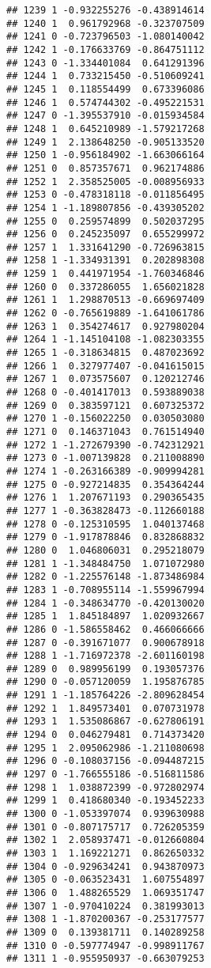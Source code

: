 \documentclass[
]{article}
\begin{document}
\begin{verbatim}
## 1239 1 -0.932255276 -0.438914614
## 1240 1  0.961792968 -0.323707509
## 1241 0 -0.723796503 -1.080140042
## 1242 1 -0.176633769 -0.864751112
## 1243 0 -1.334401084  0.641291396
## 1244 1  0.733215450 -0.510609241
## 1245 1  0.118554499  0.673396086
## 1246 1  0.574744302 -0.495221531
## 1247 0 -1.395537910 -0.015934584
## 1248 1  0.645210989 -1.579217268
## 1249 1  2.138648250 -0.905133520
## 1250 1 -0.956184902 -1.663066164
## 1251 0  0.857357671  0.962174886
## 1252 1  2.358525005 -0.008956933
## 1253 0 -0.478318118 -0.011856495
## 1254 1 -1.189807856 -0.439305202
## 1255 0  0.259574899  0.502037295
## 1256 0  0.245235097  0.655299972
## 1257 1  1.331641290 -0.726963815
## 1258 1 -1.334931391  0.202898308
## 1259 1  0.441971954 -1.760346846
## 1260 0  0.337286055  1.656021828
## 1261 1  1.298870513 -0.669697409
## 1262 0 -0.765619889 -1.641061786
## 1263 1  0.354274617  0.927980204
## 1264 1 -1.145104108 -1.082303355
## 1265 1 -0.318634815  0.487023692
## 1266 1  0.327977407 -0.041615015
## 1267 1  0.073575607  0.120212746
## 1268 0 -0.401417013  0.593889038
## 1269 0  0.383597121  0.607325372
## 1270 1 -0.156022250  0.030503080
## 1271 0  0.146371043  0.761514940
## 1272 1 -1.272679390 -0.742312921
## 1273 0 -1.007139828  0.211008890
## 1274 1 -0.263166389 -0.909994281
## 1275 0 -0.927214835  0.354364244
## 1276 1  1.207671193  0.290365435
## 1277 1 -0.363828473 -0.112660188
## 1278 0 -0.125310595  1.040137468
## 1279 0 -1.917878846  0.832868832
## 1280 0  1.046806031  0.295218079
## 1281 1 -1.348484750  1.071072980
## 1282 0 -1.225576148 -1.873486984
## 1283 1 -0.708955114 -1.559967994
## 1284 1 -0.348634770 -0.420130020
## 1285 1  1.845184897  1.020932667
## 1286 0 -1.586558462  0.466066666
## 1287 0 -0.391671077  0.900678918
## 1288 1 -1.716972378 -2.601160198
## 1289 0  0.989956199  0.193057376
## 1290 0 -0.057120059  1.195876785
## 1291 1 -1.185764226 -2.809628454
## 1292 1  1.849573401  0.070731978
## 1293 1  1.535086867 -0.627806191
## 1294 0  0.046279481  0.714373420
## 1295 1  2.095062986 -1.211080698
## 1296 0 -0.108037156 -0.094487215
## 1297 0 -1.766555186 -0.516811586
## 1298 1  1.038872399 -0.972802974
## 1299 1  0.418680340 -0.193452233
## 1300 0 -1.053397074  0.939630988
## 1301 0 -0.807175717  0.726205359
## 1302 1  2.058937471 -0.012660804
## 1303 1  1.169221271  0.862650332
## 1304 0 -0.929634241  0.943870973
## 1305 0 -0.063523431  1.607554897
## 1306 0  1.488265529  1.069351747
## 1307 1 -0.970410224  0.381993013
## 1308 1 -1.870200367 -0.253177577
## 1309 0  0.139381711  0.140289258
## 1310 0 -0.597774947 -0.998911767
## 1311 1 -0.955950937 -0.663079253

\end{verbatim}
\end{document}
